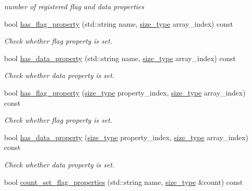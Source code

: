 \begin{DoxyCompactItemize}
\begin{DoxyCompactList}\small\item\em number of registered flag and data properties \end{DoxyCompactList}\item 
bool \hyperlink{classlb_1_1property__array_a6ba915621b1d2c1ab8cda6b5059800e8}{has\-\_\-flag\-\_\-property} (std\-::string name, \hyperlink{classlb_1_1property__array_a76d861a6fb4b99128f627ad951918429}{size\-\_\-type} array\-\_\-index) const 
\begin{DoxyCompactList}\small\item\em \-Check whether flag property is set. \end{DoxyCompactList}\item 
bool \hyperlink{classlb_1_1property__array_a6c00c9179d623124517a452356fbeb5a}{has\-\_\-data\-\_\-property} (std\-::string name, \hyperlink{classlb_1_1property__array_a76d861a6fb4b99128f627ad951918429}{size\-\_\-type} array\-\_\-index) const 
\begin{DoxyCompactList}\small\item\em \-Check whether data property is set. \end{DoxyCompactList}\item 
bool \hyperlink{classlb_1_1property__array_a36f15bca0d62eb4165904502c1191e5e}{has\-\_\-flag\-\_\-property} (\hyperlink{classlb_1_1property__array_a76d861a6fb4b99128f627ad951918429}{size\-\_\-type} property\-\_\-index, \hyperlink{classlb_1_1property__array_a76d861a6fb4b99128f627ad951918429}{size\-\_\-type} array\-\_\-index) const 
\begin{DoxyCompactList}\small\item\em \-Check whether flag property is set. \end{DoxyCompactList}\item 
bool \hyperlink{classlb_1_1property__array_aa3fce8bb2448e47b56146386992eed6f}{has\-\_\-data\-\_\-property} (\hyperlink{classlb_1_1property__array_a76d861a6fb4b99128f627ad951918429}{size\-\_\-type} property\-\_\-index, \hyperlink{classlb_1_1property__array_a76d861a6fb4b99128f627ad951918429}{size\-\_\-type} array\-\_\-index) const 
\begin{DoxyCompactList}\small\item\em \-Check whether data property is set. \end{DoxyCompactList}\item 
bool \hyperlink{classlb_1_1property__array_aca962cbb1a19356c95607b980268b670}{count\-\_\-set\-\_\-flag\-\_\-properties} (std\-::string name, \hyperlink{classlb_1_1property__array_a76d861a6fb4b99128f627ad951918429}{size\-\_\-type} \&count) const 

\end{DoxyCompactItemize}
